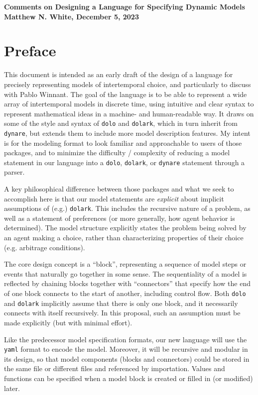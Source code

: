 \documentclass[12pt,pdftex,letterpaper]{article}
\begin{document}
\begin{center}
	\singlespace
	\textbf{Comments on Designing a Language for Specifying Dynamic Models \\ Matthew N. White, December 5, 2023}
\end{center}

\section{Preface}

This document is intended as an early draft of the design of a language for precisely representing models of intertemporal choice, and particularly to discuss with Pablo Winnant. The goal of the language is to be able to represent a wide array of intertemporal models in discrete time, using intuitive and clear syntax to represent mathematical ideas in a machine- and human-readable way. It draws on some of the style and syntax of \texttt{dolo} and \texttt{dolark}, which in turn inherit from \texttt{dynare}, but extends them to include more model description features. My intent is for the modeling format to look familiar and approachable to users of those packages, and to minimize the difficulty / complexity of reducing a model statement in our language into a \texttt{dolo}, \texttt{dolark}, or \texttt{dynare} statement through a parser.

A key philosophical difference between those packages and what we seek to accomplish here is that our model statements are \textit{explicit} about implicit assumptions of (e.g.) \texttt{dolark}. This includes the recursive nature of a problem, as well as a statement of preferences (or more generally, how agent behavior is determined). The model structure explicitly states the problem being solved by an agent making a choice, rather than characterizing properties of their choice (e.g. arbitrage conditions).

The core design concept is a ``block'', representing a sequence of model steps or events that naturally go together in some sense. The sequentiality of a model is reflected by chaining blocks together with ``connectors'' that specify how the end of one block connects to the start of another, including control flow. Both \texttt{dolo} and \texttt{dolark} implicitly assume that there is only one block, and it necessarily connects with itself recursively. In this proposal, such an assumption must be made explicitly (but with minimal effort).

Like the predecessor model specification formats, our new language will use the \texttt{yaml} format to encode the model. Moreover, it will be recursive and modular in its design, so that model components (blocks and connectors) could be stored in the same file or different files and referenced by importation. Values and functions can be specified when a model block is created or filled in (or modified) later.
\end{document}
